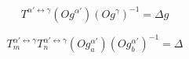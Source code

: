 $$T^{\alpha'\leftrightarrow\gamma}\left(Og^{\alpha'}\right)\left(Og^{\gamma}\right)^{-1} = \Delta g \label{eq:1}$$

$$T_{m}^{\alpha'\leftrightarrow\gamma}T_{n}^{\alpha'\leftrightarrow\gamma}\left(Og_{a}^{\alpha'}\right)\left(Og_{b}^{\alpha'}\right)^{-1} = \Delta  \label{eq:2}$$
